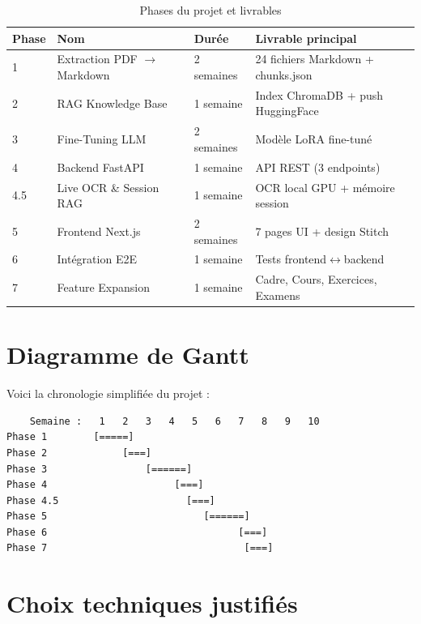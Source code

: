 \documentclass[12pt,a4paper]{report}
\begin{document}
\begin{table}[h!]
    \centering
    \begin{tabular}{p{1cm} p{4cm} p{2.5cm} p{6.5cm}}
        \toprule
        \textbf{Phase} & \textbf{Nom} & \textbf{Durée} & \textbf{Livrable principal} \\
        \midrule
        1 & Extraction PDF $\rightarrow$ Markdown & 2 semaines & 24 fichiers Markdown + chunks.json \\
        2 & RAG Knowledge Base & 1 semaine & Index ChromaDB + push HuggingFace \\
        3 & Fine-Tuning LLM & 2 semaines & Modèle LoRA fine-tuné \\
        4 & Backend FastAPI & 1 semaine & API REST (3 endpoints) \\
        4.5 & Live OCR \& Session RAG & 1 semaine & OCR local GPU + mémoire session \\
        5 & Frontend Next.js & 2 semaines & 7 pages UI + design Stitch \\
        6 & Intégration E2E & 1 semaine & Tests frontend$\leftrightarrow$backend \\
        7 & Feature Expansion & 1 semaine & Cadre, Cours, Exercices, Examens \\
        \bottomrule
    \end{tabular}
    \caption{Phases du projet et livrables}
\end{table}

\section{Diagramme de Gantt}
Voici la chronologie simplifiée du projet :

\begin{verbatim}
    Semaine :   1   2   3   4   5   6   7   8   9   10
Phase 1        [=====]
Phase 2             [===]
Phase 3                 [======]
Phase 4                      [===]
Phase 4.5                      [===]
Phase 5                           [======]
Phase 6                                 [===]
Phase 7                                  [===]
\end{verbatim}

\section{Choix techniques justifiés}
\end{document}
